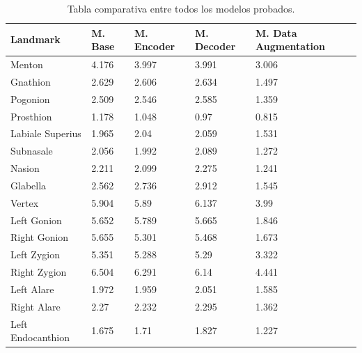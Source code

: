         \begin{table}[!ht]
            \centering
            \caption{Tabla comparativa entre todos los modelos probados.}
            \begin{tabular}{|l|l|l|l|l|}
            \hline
                \cellcolor{gray!25}\textbf{Landmark} & \cellcolor{gray!25}\textbf{M. Base} & \cellcolor{gray!25}\textbf{M. Encoder} & \cellcolor{gray!25}\textbf{M. Decoder} & \cellcolor{gray!25}\textbf{M. Data Augmentation} \\ \hline
                Menton & 4.176 & 3.997 & 3.991 & \cellcolor{green!25}3.006 \\ \hline
                Gnathion & 2.629 & 2.606 & 2.634 & \cellcolor{green!25}1.497 \\ \hline
                Pogonion & 2.509 & 2.546 & 2.585 & \cellcolor{green!25}1.359 \\ \hline
                Prosthion & 1.178 & 1.048 & 0.97 & \cellcolor{green!25}0.815 \\ \hline
                Labiale Superius & 1.965 & 2.04 & 2.059 & \cellcolor{green!25}1.531 \\ \hline
                Subnasale & 2.056 & 1.992 & 2.089 & \cellcolor{green!25}1.272 \\ \hline
                Nasion & 2.211 & 2.099 & 2.275 & \cellcolor{green!25}1.241 \\ \hline
                Glabella & 2.562 & 2.736 & 2.912 & \cellcolor{green!25}1.545 \\ \hline
                \cellcolor{yellow!50}Vertex & \cellcolor{yellow!50}5.904 & \cellcolor{yellow!50}5.89 & \cellcolor{yellow!50}6.137 & \cellcolor{yellow!50}3.99 \\ \hline
                Left Gonion & 5.652 & 5.789 & 5.665 & \cellcolor{green!50}1.846 \\ \hline
                Right Gonion & 5.655 & 5.301 & 5.468 & \cellcolor{green!50}1.673 \\ \hline
                Left Zygion & 5.351 & 5.288 & 5.29 & \cellcolor{green!50}3.322 \\ \hline
                Right Zygion & 6.504 & 6.291 & 6.14 & \cellcolor{green!50}4.441 \\ \hline
                Left Alare & 1.972 & 1.959 & 2.051 & \cellcolor{green!25}1.585 \\ \hline
                Right Alare & 2.27 & 2.232 & 2.295 & \cellcolor{green!25}1.362 \\ \hline
                Left Endocanthion & 1.675 & 1.71 & 1.827 & \cellcolor{green!25}1.227 \\ \hline

\end{tabular}
\end{table}
